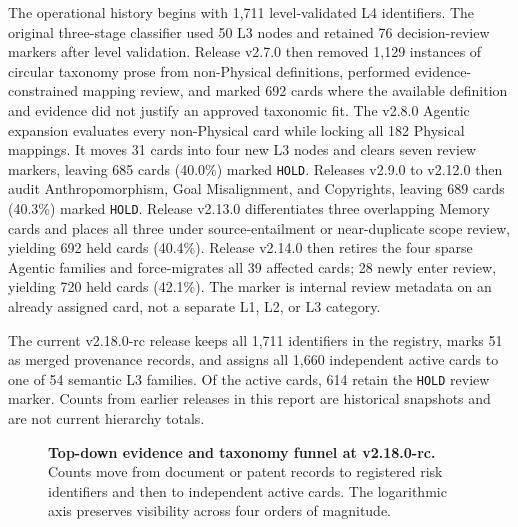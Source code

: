 \documentclass[11pt,a4paper]{article}
\newcommand{\code}[1]{\texttt{#1}}
\begin{document}
The operational history begins with 1,711 level-validated L4 identifiers.
The original three-stage classifier used 50 L3 nodes and retained
76 decision-review markers after level validation. Release v2.7.0 then removed
1,129 instances of circular taxonomy prose from non-Physical definitions,
performed evidence-constrained mapping review, and marked 692 cards where the
available definition and evidence did not justify an approved taxonomic fit.
The v2.8.0 Agentic expansion evaluates every non-Physical card while locking
all 182 Physical mappings. It moves 31 cards into four new L3 nodes and clears
seven review markers, leaving 685 cards (40.0\%) marked \code{HOLD}. Releases
v2.9.0 to v2.12.0 then audit Anthropomorphism, Goal Misalignment, and Copyrights,
leaving 689 cards (40.3\%) marked \code{HOLD}. Release v2.13.0 differentiates
three overlapping Memory cards and places all three under source-entailment or
near-duplicate scope review, yielding 692 held cards (40.4\%). Release v2.14.0
then retires the four sparse Agentic families and force-migrates all 39 affected
cards; 28 newly enter review, yielding 720 held cards (42.1\%). The marker
is internal review metadata on an already assigned card, not a separate L1,
L2, or L3 category.

The current v2.18.0-rc release keeps all 1,711 identifiers in the registry,
marks 51 as merged provenance records, and assigns all 1,660 independent active
cards to one of 54 semantic L3 families. Of the active cards, 614 retain the
\code{HOLD} review marker. Counts from earlier releases in this report are
historical snapshots and are not current hierarchy totals.

\begin{figure}[H]
\centering
{}
\caption{\textbf{Top-down evidence and taxonomy funnel at v2.18.0-rc.}
Counts move from document or patent records to registered risk identifiers and
then to independent active cards. The logarithmic axis preserves visibility
across four orders of magnitude.}
\label{fig:funnel}
\end{figure}
\end{document}
